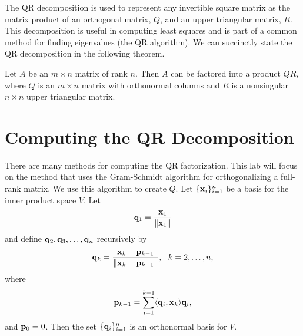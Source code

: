 \label{lab:QRdecomp}


The QR decomposition is used to represent any invertible square matrix as the matrix product of an orthogonal matrix, $Q$, and an upper triangular matrix, $R$.
This decomposition is useful in computing least squares and is part of a common method for finding eigenvalues (the QR algorithm).
We can succinctly state the QR decomposition in the following theorem.
\begin{theorem}
Let $A$ be an $m\times n$ matrix of rank $n$.  Then $A$ can be
factored into a product $Q R$, where $Q$ is an $m\times n$ matrix
with orthonormal columns and $R$ is a nonsingular $n \times n$ upper
triangular matrix.
\end{theorem}

\section*{Computing the QR Decomposition}
There are many methods for computing the QR factorization.
This lab will focus on the method that uses the Gram-Schmidt algorithm for orthogonalizing 
a full-rank matrix.
We use this algorithm to create $Q$.
Let $\{{\bf x}_i\}_{i=1}^n$ be a basis for the inner product space $V$.
Let \[ {\bf q}_1 = \frac{{\bf x}_1}{\left\lVert{\bf x}_1\right\rVert}\] and define ${\bf q}_2,{\bf q}_3,\ldots,{\bf q}_n$ recursively by
$$ 
{\bf q}_{k} = \frac{{\bf x}_k - {\bf p}_{k-1}}{\|{\bf x}_k - {\bf p}_{k-1}\|}, \,\,\,\, k=2,\ldots,n,
$$
where
$$
{\bf p}_{k-1} = \sum_{i=1}^{k-1} \langle {\bf q}_i, {\bf x}_k\rangle {\bf q}_i,
$$
and ${\bf p}_0 = 0$. 
Then the set $\{{\bf q}_i\}_{i=1}^n$ is an orthonormal basis for $V$.

